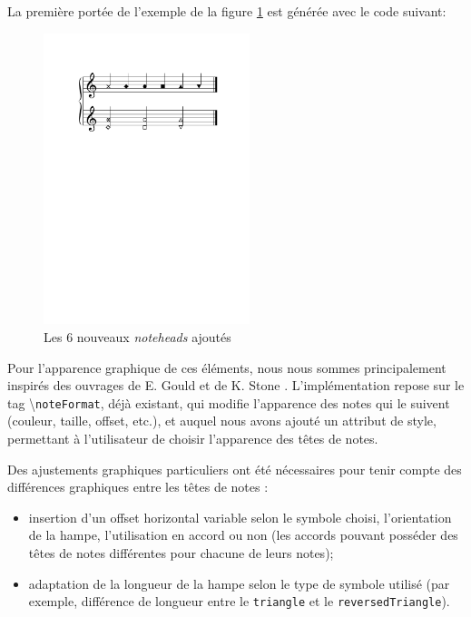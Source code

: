 \documentclass{article}
\newenvironment{gmncode}	{\vspace{-2mm}\small\verbatim}{\endverbatim\vspace{-2mm}}
\newcommand{\code}[1]		{{\small \texttt{#1}}}
\newcommand{\guidotag}[1]	{\textbackslash\code{#1}}
\begin{document}
\vspace{2mm}
La première portée de l'exemple de la figure \ref{fig:noteheads} est générée avec le code suivant:
\begin{gmncode}
[
  \noteFormat<style="x"> a
  \noteFormat<style="diamond"> a
  \noteFormat<style="round"> a
  \noteFormat<style="square"> a
  \noteFormat<style="triangle"> a
  \noteFormat<style="reversedTriangle"> a
]
\end{gmncode}
%
\begin{figure}[h]
\centering
\includegraphics[width=6cm]{img/partitions/noteheads.pdf}
\caption{Les 6 nouveaux \emph{noteheads} ajoutés}
\label{fig:noteheads}
\end{figure}
%
\bigskip

Pour l'apparence graphique de ces éléments, nous nous sommes principalement inspirés des ouvrages de E. Gould \cite{gould2011behind} et de K. Stone \cite{stone1980music}.
L'implémentation repose sur le tag \guidotag{noteFormat}, déjà existant, qui modifie l'apparence des notes qui le suivent (couleur, taille, offset, etc.), et auquel nous avons ajouté un attribut de style, permettant à l'utilisateur de choisir l'apparence des têtes de notes.

Des ajustements graphiques particuliers ont été nécessaires pour tenir compte des différences graphiques entre les têtes de notes :
\begin{itemize}
    \item insertion d'un offset horizontal variable selon le symbole choisi, l'orientation de la hampe, l'utilisation en accord ou non (les accords pouvant posséder des têtes de notes différentes pour chacune de leurs notes);
    \item adaptation de la longueur de la hampe selon le type de symbole utilisé (par exemple, différence de longueur entre le \code{triangle} et le \code{reversedTriangle}).
\end{itemize}
\end{document}
